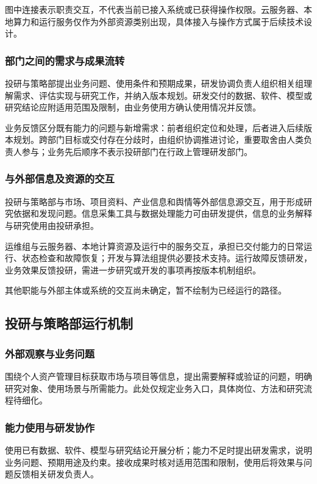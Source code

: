 \documentclass[11pt,a4paper]{article}
\begin{document}
图中连接表示职责交互，不代表当前已接入系统或已获得操作权限。云服务器、本地算力和运行服务仅作为外部资源类别出现，具体接入与操作方式属于后续技术设计。

\subsubsection{部门之间的需求与成果流转}
投研与策略部提出业务问题、使用条件和预期成果，研发协调负责人组织相关组理解需求、评估实现与研究工作，并纳入版本规划。研发交付的数据、软件、模型或研究结论应附适用范围及限制，由业务使用方确认使用情况并反馈。

业务反馈区分既有能力的问题与新增需求：前者组织定位和处理，后者进入后续版本规划。跨部门目标或交付存在分歧时，由组织协调推进讨论，重要取舍由人类负责人参与；业务先后顺序不表示投研部门在行政上管理研发部门。

\subsubsection{与外部信息及资源的交互}
投研与策略部与市场、项目资料、产业信息和舆情等外部信息源交互，用于形成研究依据和发现问题。信息采集工具与数据处理能力可由研发提供，信息的业务解释与研究使用由投研承担。

运维组与云服务器、本地计算资源及运行中的服务交互，承担已交付能力的日常运行、状态检查和故障恢复；开发与算法组提供必要技术支持。运行故障反馈研发，业务效果反馈投研，需进一步研究或开发的事项再按版本机制组织。

其他职能与外部主体或系统的交互尚未确定，暂不绘制为已经运行的路径。

\subsection{投研与策略部运行机制}
\subsubsection{外部观察与业务问题}
围绕个人资产管理目标获取市场与项目等信息，提出需要解释或验证的问题，明确研究对象、使用场景与所需能力。此处仅规定业务入口，具体岗位、方法和研究流程待细化。

\subsubsection{能力使用与研发协作}
使用已有数据、软件、模型与研究结论开展分析；能力不足时提出研发需求，说明业务问题、预期用途及约束。接收成果时核对适用范围和限制，使用后将效果与问题反馈相关研发负责人。
\end{document}
